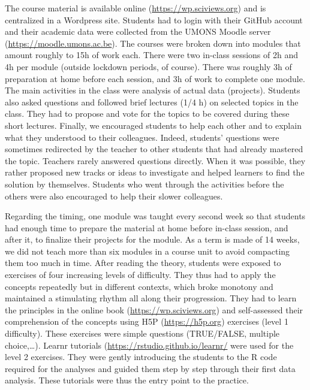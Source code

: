 \documentclass{aims}
\theoremstyle{definition}
\begin{document}
The course material is available online (\url{https://wp.sciviews.org})
and is centralized in a Wordpress site. Students had to login with their
GitHub account and their academic data were collected from the UMONS
Moodle server (\url{https://moodle.umons.ac.be}). The courses were
broken down into modules that amount roughly to 15h of work each. There
were two in-class sessions of 2h and 4h per module (outside lockdown
periods, of course). There was roughly 3h of preparation at home before
each session, and 3h of work to complete one module. The main activities
in the class were analysis of actual data (projects). Students also
asked questions and followed brief lectures (1/4 h) on selected topics
in the class. They had to propose and vote for the topics to be covered
during these short lectures. Finally, we encouraged students to help
each other and to explain what they understood to their colleagues.
Indeed, students' questions were sometimes redirected by the teacher to
other students that had already mastered the topic. Teachers rarely
answered questions directly. When it was possible, they rather proposed
new tracks or ideas to investigate and helped learners to find the
solution by themselves. Students who went through the activities before
the others were also encouraged to help their slower colleagues.

Regarding the timing, one module was taught every second week so that
students had enough time to prepare the material at home before in-class
session, and after it, to finalize their projects for the module. As a
term is made of 14 weeks, we did not teach more than six modules in a
course unit to avoid compacting them too much in time. After reading the
theory, students were exposed to exercises of four increasing levels of
difficulty. They thus had to apply the concepts repeatedly but in
different contexts, which broke monotony and maintained a stimulating
rhythm all along their progression. They had to learn the principles in
the online book (\url{https://wp.sciviews.org}) and self-assessed their
comprehension of the concepts using H5P (\url{https://h5p.org})
exercises (level 1 difficulty). These exercises were simple questions
(TRUE/FALSE, multiple choice,\ldots). Learnr tutorials
(\url{https://rstudio.github.io/learnr/} were used for the level 2
exercises. They were gently introducing the students to the R code
required for the analyses and guided them step by step through their
first data analysis. These tutorials were thus the entry point to the
practice.
\end{document}
